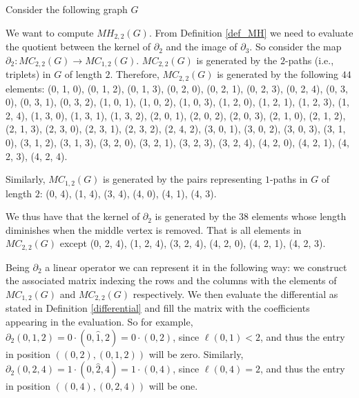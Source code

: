 \documentclass[runningheads]{llncs}
\begin{document}
\begin{example}
\label{toyexample}
Consider the following graph $G$

\begin{center}
\end{center}

We want to compute $MH_{2,2}(G)$.
From Definition \ref{def_MH} we need to evaluate the quotient between the kernel of $\partial_2$ and the image of $\partial_3$.
So consider the map $\partial_2 : MC_{2,2}(G) \to MC_{1,2}(G)$.
$MC_{2,2}(G)$ is generated by the $2$-paths (i.e., triplets) in $G$ of length $2$. 
Therefore, $MC_{2,2}(G)$ is generated by the following $44$ elements: (0, 1, 0), (0, 1, 2), (0, 1, 3), (0, 2, 0), (0, 2, 1), (0, 2, 3), (0, 2, 4), (0, 3, 0), (0, 3, 1), (0, 3, 2), (1, 0, 1), (1, 0, 2), (1, 0, 3), (1, 2, 0), (1, 2, 1), (1, 2, 3), (1, 2, 4), (1, 3, 0), (1, 3, 1), (1, 3, 2), (2, 0, 1), (2, 0, 2), (2, 0, 3), (2, 1, 0), (2, 1, 2), (2, 1, 3), (2, 3, 0), (2, 3, 1), (2, 3, 2), (2, 4, 2), (3, 0, 1), (3, 0, 2), (3, 0, 3), (3, 1, 0), (3, 1, 2), (3, 1, 3), (3, 2, 0), (3, 2, 1), (3, 2, 3), (3, 2, 4), (4, 2, 0), (4, 2, 1), (4, 2, 3), (4, 2, 4).

Similarly, $MC_{1,2}(G)$ is generated by the pairs representing $1$-paths in $G$ of length $2$: (0, 4), (1, 4), (3, 4), (4, 0), (4, 1), (4, 3).

We thus have that the kernel of $\partial_2$ is generated by the $38$ elements whose length diminishes when the middle vertex is removed. That is all elements in $MC_{2,2}(G)$ except (0, 2, 4), (1, 2, 4), (3, 2, 4), (4, 2, 0), (4, 2, 1), (4, 2, 3).  

Being $\partial_2$ a linear operator we can represent it in the following way: we construct the associated matrix indexing the rows and the columns with the elements of $MC_{1,2}(G)$ and $MC_{2,2}(G)$ respectively.
We then evaluate the differential as stated in Definition \ref{differential} and fill the matrix with the coefficients appearing in the evaluation.
So for example, $\partial_2 (0,1,2)=0\cdot (0, \hat{1}, 2)=0\cdot (0, 2)$, since $\ell(0,1)<2$, and thus the entry in position $((0,2),(0,1,2))$ will be zero.
Similarly, $\partial_2 (0,2,4)=1\cdot (0, \hat{2}, 4)=1\cdot (0, 4)$, since $\ell(0,4)=2$, and thus the entry in position $((0,4),(0,2,4))$ will be one.


\end{example}
\end{document}
